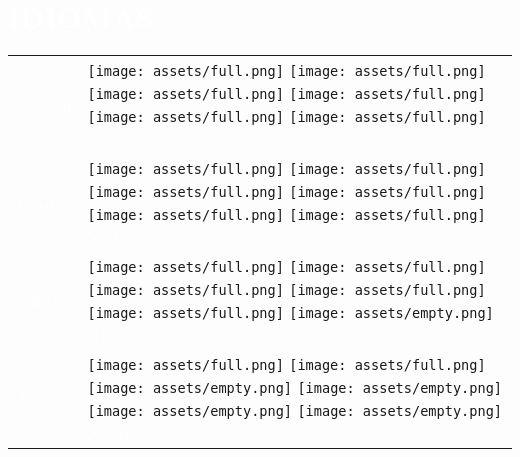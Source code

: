 \documentclass[../main.tex]{subfiles}
\begin{document}
    \vspace*{0.25cm}\section*{\hspace*{0.4cm}\textcolor{white}{IDIOMAS}}
    \vspace*{-0.15cm}
    \begin{tabular}{r l}
    \hspace*{0.5cm}
    \textcolor{white}{\vspace*{0.1cm}Catalán} &            
            \texttt{[image: assets/full.png]}
            \texttt{[image: assets/full.png]}
            \texttt{[image: assets/full.png]}
            \texttt{[image: assets/full.png]}
            \texttt{[image: assets/full.png]}
            \texttt{[image: assets/full.png]}
            \textcolor{white}{\hspace*{0.05cm} Nativo}\\ 
    \textcolor{white}{\vspace*{0.1cm}Español} &
            \texttt{[image: assets/full.png]}
            \texttt{[image: assets/full.png]}
            \texttt{[image: assets/full.png]}
            \texttt{[image: assets/full.png]}
            \texttt{[image: assets/full.png]}
            \texttt{[image: assets/full.png]}
            \textcolor{white}{\hspace*{0.05cm} Nativo}\\
    \textcolor{white}{\vspace*{0.1cm}Inglés} &
            \texttt{[image: assets/full.png]}
            \texttt{[image: assets/full.png]}
            \texttt{[image: assets/full.png]}
            \texttt{[image: assets/full.png]}
            \texttt{[image: assets/full.png]}
            \texttt{[image: assets/empty.png]}
            \textcolor{white}{\hspace*{0.05cm} C1, Advanced}\\
    \textcolor{white}{Francés} &
            \texttt{[image: assets/full.png]}
            \texttt{[image: assets/full.png]}
            \texttt{[image: assets/empty.png]}
            \texttt{[image: assets/empty.png]}
            \texttt{[image: assets/empty.png]}
            \texttt{[image: assets/empty.png]}
            \textcolor{white}{\hspace*{0.05cm} A2, Básico}\\
    \end{tabular}
\end{document}
